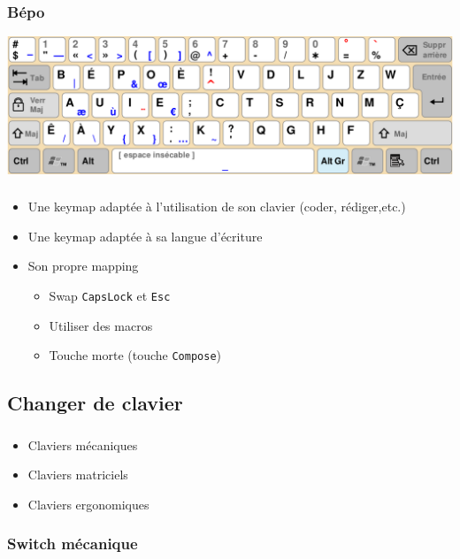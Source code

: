 \documentclass[c,12pt]{beamer}
\begin{document}
\begin{frame}
	\frametitle{Bépo}
	\begin{center}
		\includegraphics[scale=0.26]{Bepo.png}
	\end{center}
\end{frame}

\begin{frame}
	\frametitle{\subsecname}
	\begin{itemize}
		\item{Une keymap adaptée à l'utilisation de son clavier (coder,
			rédiger,etc.)}
		\item<1->{Une keymap adaptée à sa langue d'écriture}
		\item<2->{Son propre mapping}
			\begin{itemize}
				\item<3->{Swap \texttt{CapsLock} et \texttt{Esc}}
				\item<4->{Utiliser des macros}
				\item<5->{Touche morte (touche \texttt{Compose})}
			\end{itemize}
	\end{itemize}
\end{frame}

\subsection{Changer de clavier}

\begin{frame}
	\frametitle{\subsecname}
	\begin{itemize}
		\item<2->{Claviers mécaniques}
		\item<3->{Claviers matriciels}
		\item<4->{Claviers ergonomiques}
	\end{itemize}
\end{frame}

\begin{frame}
	\frametitle{Switch mécanique}
	\begin{center}
	\end{center}
\end{frame}
\end{document}
